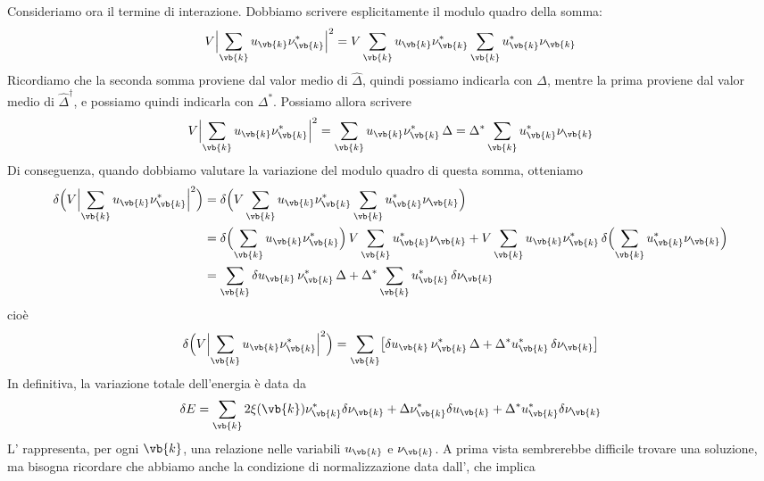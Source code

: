 Consideriamo ora il termine di interazione. Dobbiamo scrivere esplicitamente il modulo quadro della somma:
\begin{equation*}
   V \Bigl| \sum_{\vb{k}} u_{\vb{k}} \nu_{\vb{k}}^* \Bigr|^2
   =V \sum_{\vb{k}} u_{\vb{k}} \nu_{\vb{k}}^* \sum_{\vb{k}} u_{\vb{k}}^* \nu_{\vb{k}}
\end{equation*}
Ricordiamo che la seconda somma proviene dal valor medio di $\hat{\Delta}$, quindi possiamo indicarla con $\Delta$, mentre la prima proviene dal valor medio di $\hat{\Delta}^\dagger$, e possiamo quindi indicarla con $\Delta^*$. Possiamo allora scrivere
\begin{equation*}
   V \Bigl| \sum_{\vb{k}} u_{\vb{k}} \nu_{\vb{k}}^* \Bigr|^2
   =\sum_{\vb{k}} u_{\vb{k}} \nu_{\vb{k}}^* \,\Delta
   =\Delta^* \sum_{\vb{k}} u_{\vb{k}}^* \nu_{\vb{k}}
\end{equation*}
Di conseguenza, quando dobbiamo valutare la variazione del modulo quadro di questa somma, otteniamo
\begin{equation*}
   \begin{split}
      \delta \Bigl( V \Bigl| \sum_{\vb{k}} u_{\vb{k}} \nu_{\vb{k}}^* \Bigr|^2 \Bigr)
      & =\delta \Bigl( V \sum_{\vb{k}} u_{\vb{k}} \nu_{\vb{k}}^* \sum_{\vb{k}} u_{\vb{k}}^* \nu_{\vb{k}} \Bigr)
      \\
      & =\delta \Bigl( \sum_{\vb{k}} u_{\vb{k}} \nu_{\vb{k}}^* \Bigr)\, V \sum_{\vb{k}} u_{\vb{k}}^* \nu_{\vb{k}}
      +
      V \sum_{\vb{k}} u_{\vb{k}} \nu_{\vb{k}}^* \,\delta \Bigl( \sum_{\vb{k}} u_{\vb{k}}^* \nu_{\vb{k}} \Bigr)
      \\
      & =\sum_{\vb{k}} \delta u_{\vb{k}}\, \nu_{\vb{k}}^* \,\Delta
      +
      \Delta^* \sum_{\vb{k}} u_{\vb{k}}^* \,\delta \nu_{\vb{k}}
   \end{split}
\end{equation*}
cioè
\begin{equation*}
   \delta \Bigl( V \Bigl| \sum_{\vb{k}} u_{\vb{k}} \nu_{\vb{k}}^* \Bigr|^2 \Bigr)
   = \sum_{\vb{k}} \bigl[ \delta u_{\vb{k}} \,\nu_{\vb{k}}^* \,\Delta + \Delta^* u_{\vb{k}}^* \,\delta \nu_{\vb{k}} \bigr]
\end{equation*}
In definitiva, la variazione totale dell'energia è data da
\begin{equation}
   \delta E
   =\sum_{\vb{k}}
   2\xi(\vb{k}) \nu_{\vb{k}}^* \delta \nu_{\vb{k}}
   + \Delta \nu_{\vb{k}}^* \delta u_{\vb{k}}
   + \Delta^* u_{\vb{k}}^* \delta \nu_{\vb{k}}
   \label{eq:variation_energy}
\end{equation}
L' rappresenta, per ogni $\vb{k}$, una relazione nelle variabili $u_{\vb{k}}$ e $\nu_{\vb{k}}$. A prima vista sembrerebbe difficile trovare una soluzione, ma bisogna ricordare che abbiamo anche la condizione di normalizzazione data dall', che implica
